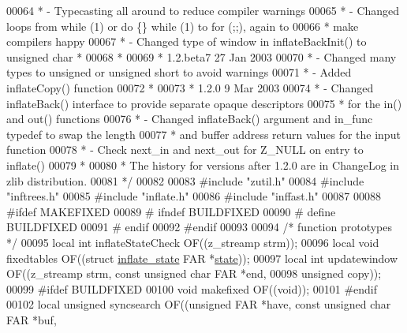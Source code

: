 \begin{DoxyCode}
00064 \textcolor{comment}{ * - Typecasting all around to reduce compiler warnings}
00065 \textcolor{comment}{ * - Changed loops from while (1) or do \{\} while (1) to for (;;), again to}
00066 \textcolor{comment}{ *   make compilers happy}
00067 \textcolor{comment}{ * - Changed type of window in inflateBackInit() to unsigned char *}
00068 \textcolor{comment}{ *}
00069 \textcolor{comment}{ * 1.2.beta7    27 Jan 2003}
00070 \textcolor{comment}{ * - Changed many types to unsigned or unsigned short to avoid warnings}
00071 \textcolor{comment}{ * - Added inflateCopy() function}
00072 \textcolor{comment}{ *}
00073 \textcolor{comment}{ * 1.2.0        9 Mar 2003}
00074 \textcolor{comment}{ * - Changed inflateBack() interface to provide separate opaque descriptors}
00075 \textcolor{comment}{ *   for the in() and out() functions}
00076 \textcolor{comment}{ * - Changed inflateBack() argument and in\_func typedef to swap the length}
00077 \textcolor{comment}{ *   and buffer address return values for the input function}
00078 \textcolor{comment}{ * - Check next\_in and next\_out for Z\_NULL on entry to inflate()}
00079 \textcolor{comment}{ *}
00080 \textcolor{comment}{ * The history for versions after 1.2.0 are in ChangeLog in zlib distribution.}
00081 \textcolor{comment}{ */}
00082 
00083 \textcolor{preprocessor}{#include "zutil.h"}
00084 \textcolor{preprocessor}{#include "inftrees.h"}
00085 \textcolor{preprocessor}{#include "inflate.h"}
00086 \textcolor{preprocessor}{#include "inffast.h"}
00087 
00088 \textcolor{preprocessor}{#ifdef MAKEFIXED}
00089 \textcolor{preprocessor}{#  ifndef BUILDFIXED}
00090 \textcolor{preprocessor}{#    define BUILDFIXED}
00091 \textcolor{preprocessor}{#  endif}
00092 \textcolor{preprocessor}{#endif}
00093 
00094 \textcolor{comment}{/* function prototypes */}
00095 local \textcolor{keywordtype}{int} inflateStateCheck OF((z\_streamp strm));
00096 local \textcolor{keywordtype}{void} fixedtables OF((\textcolor{keyword}{struct} \hyperlink{structinflate__state}{inflate\_state} FAR *\hyperlink{structstate}{state}));
00097 local \textcolor{keywordtype}{int} updatewindow OF((z\_streamp strm, \textcolor{keyword}{const} \textcolor{keywordtype}{unsigned} \textcolor{keywordtype}{char} FAR *end,
00098                            \textcolor{keywordtype}{unsigned} copy));
00099 \textcolor{preprocessor}{#ifdef BUILDFIXED}
00100    \textcolor{keywordtype}{void} makefixed OF((\textcolor{keywordtype}{void}));
00101 \textcolor{preprocessor}{#endif}
00102 local \textcolor{keywordtype}{unsigned} syncsearch OF((\textcolor{keywordtype}{unsigned} FAR *have, \textcolor{keyword}{const} \textcolor{keywordtype}{unsigned} \textcolor{keywordtype}{char} FAR *buf,

\end{DoxyCode}

